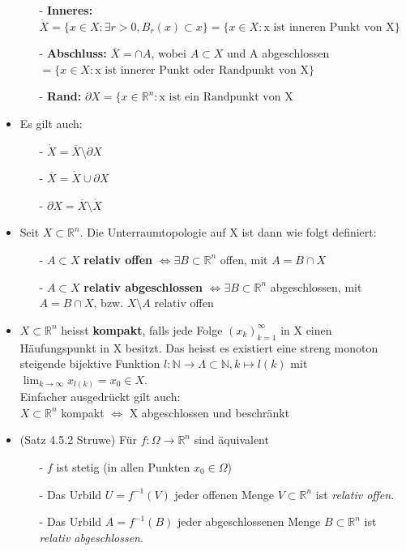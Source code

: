 \documentclass[8pt, a4paper, landscape, fleqn]{scrartcl}
\def\R{\mathbb{R}}
\begin{document}
\begin{multicols*}{3}
\begin{itemize}
\begin{itemize}
		                \item[-] \textbf{Inneres:} $\mathring X = \{x \in X: \exists r > 0, B_r(x) \subset x\} = \{x \in X: \text{x ist inneren Punkt von X}\}$
		                \item[-] \textbf{Abschluss:} $\overline{X} = \cap A$, wobei $A\subset X$ und A abgeschlossen $= \{x \in X: \text{x ist innerer Punkt oder Randpunkt von X} \}$
		                \item[-] \textbf{Rand:} $\partial X = \{x \in \mathbb{R}^n : \text{x ist ein Randpunkt von X}$
		            \end{itemize}
		            \item Es gilt auch:
		            \begin{itemize}
		                \item[-] $\mathring X = \overline X \setminus \partial X$
		                \item[-] $\overline X = \mathring X \cup \partial X$
		                \item[-] $\partial X = \overline X \setminus \mathring X$
		            \end{itemize}
		            \item Seit $X \subset \mathbb{R}^n$. Die Unterraumtopologie auf X ist dann wie folgt definiert:
		            \begin{itemize}
		                \item[-] $A\subset X$ \textbf{relativ offen} $\Leftrightarrow \exists B \subset \mathbb{R}^n$ offen, mit $A = B \cap X$
		                \item[-] $A\subset X$ \textbf{relativ abgeschlossen} $\Leftrightarrow \exists B \subset \mathbb{R}^n$ abgeschlossen, mit $A = B \cap X$, bzw. $X\setminus A$ relativ offen
		            \end{itemize}
		            \item $X \subset \mathbb{R}^n$ heisst \textbf{kompakt}, falls jede Folge $(x_k)_{k=1}^{\infty}$ in X einen Häufungspunkt in X besitzt. Das heisst es existiert eine streng monoton steigende bijektive Funktion $l: \mathbb{N} \rightarrow \Lambda \subset \mathbb{N}, k \mapsto l(k)$ mit $\lim_{k\rightarrow \infty} x_{l(k)} = x_0 \in X$.\\
		            Einfacher ausgedrückt gilt auch:\\
		            $X \subset \mathbb{R}^n$ kompakt $\Leftrightarrow$ X abgeschlossen und beschränkt
		            \item (Satz 4.5.2 Struwe) Für $f:\Omega\to\R^n$ sind äquivalent
		            \begin{itemize}
		                \item[-] $f$ ist stetig (in allen Punkten $x_0 \in \Omega$)
		                \item[-] Das Urbild $U = f^{-1}(V)$ jeder offenen Menge $V \subset \R^n$ ist \textit{relativ offen}.
		                \item[-] Das Urbild $A = f^{-1}(B)$ jeder abgeschlossenen Menge $B\subset \R^n$ ist \textit{relativ abgeschlossen}.
		            \end{itemize}
		        \end{itemize}

\end{multicols*}
\end{document}
